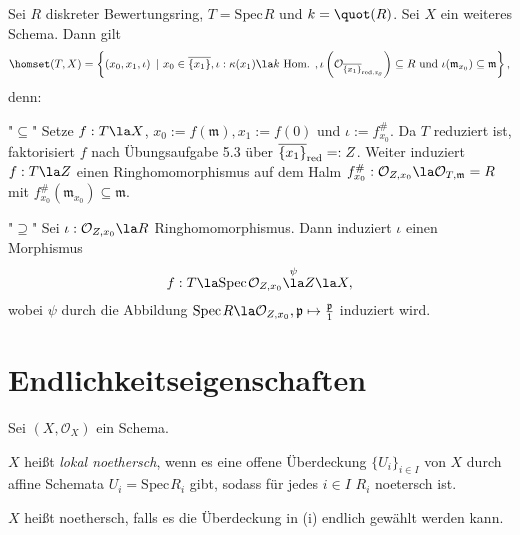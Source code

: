 \documentclass[11pt]{book}
\theoremstyle{nonumberbreak}
\newenvironment{defin}[1][]{\ifthenelse{\equal{#1}{}}{\definition}{\definition[#1]}\rm}{\enddefinition}
\newenvironment{ex}[1][]{\ifthenelse{\equal{#1}{}}{\example}{\example[#1]}\rm}{\endexample}
\newcommand{\spec}{\mathrm{Spec} \hspace{1pt} }
\newcommand{\p}{\mathfrak{p}}
\newcommand{\K}{k}
\begin{document}
\begin{spacing}{1.4}
\begin{ex}   %
Sei $R$ diskreter Bewertungsring, $T = \spec R$ und $\K = \quot(R)$. Sei $X$ ein weiteres Schema. Dann gilt 
$$\homset (T,X) = \left\{ \left(x_0, x_1, \iota\right) \ \vert \ x_0 \in \overline{\{x_1\}}, \iota: \kappa(x_1) \la \K \textrm{ Hom. }, \iota\left( \mathcal{O}_{\overline{\{x_1\}}_{\rm{red}\it, x_0}} \right) \subseteq R \textrm{ und } \iota(\mathfrak{m}_{x_0}) \subseteq \mathfrak{m} \right\},$$
denn:
\begin{compactenum}
\item["$\subseteq$"] Setze $f: T \la X$, $x_0:= f(\mathfrak{m}), x_1:= f(0)$ und $\iota:= f_{x_0}^\#$. Da $T$ reduziert ist, faktorisiert $f$ nach Übungsaufgabe 5.3 über $\overline{\{x_1\}}_{\rm{red}\it}=:Z$. Weiter induziert $f: T \la Z$ einen Ringhomomorphismus auf dem Halm $f_{x_0}^\#: \mathcal{O}_{Z,x_0} \la \mathcal{O}_{T,\mathfrak{m}} = R$ mit $f_{x_0}^\#\left(\mathfrak{m}_{x_0}\right) \subseteq \mathfrak{m}$.
\item["$\supseteq$"] Sei $\iota: \mathcal{O}_{Z,x_0} \la R$ Ringhomomorphismus. Dann induziert $\iota$ einen Morphismus $$f: T \la \spec \mathcal{O}_{Z,x_0} \overset{\psi}{\la} Z \la X,$$wobei $\psi$ durch die Abbildung $\spec R \la \mathcal{O}_{Z,x_0}, \p \mapsto \frac{\p}{1}$ induziert wird.

\end{compactenum}



\end{ex}





\newcommand{\Ocal}{\mathcal{O}}
\newcommand{\comp}{\begin{compactenum}}
\newcommand{\cend}{\end{compactenum}}



\renewcommand*\thesection{§ \arabic{section}\quad}
\section{Endlichkeitseigenschaften} %
\renewcommand*\thesection{\arabic{section}}


\begin{defin}   %
Sei $(X, \Ocal_X)$ ein Schema.
\comp
\item $X$ heißt \textit{lokal noethersch}, wenn es eine offene Überdeckung $\{U_i\}_{i \in I}$ von $X$ durch affine Schemata $U_i =\spec R_i$ gibt, sodass für jedes $i \in I$ $R_i$ noetersch ist.
\item $X$ heißt noethersch, falls es die Überdeckung in (i) endlich gewählt werden kann.
\cend


\end{defin}
\end{spacing}
\end{document}

